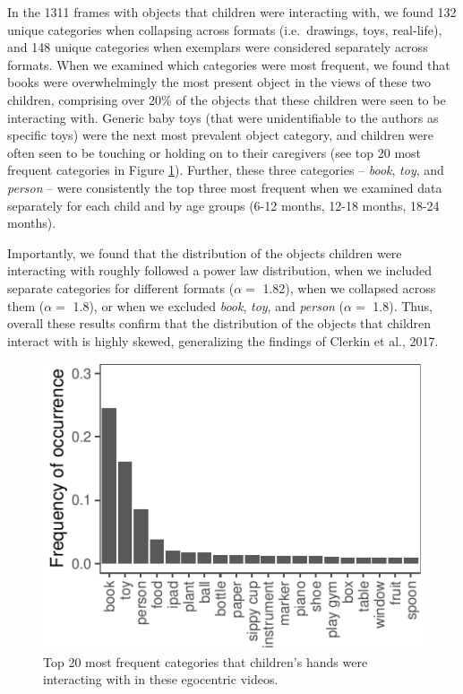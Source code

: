 \documentclass[10pt, letterpaper]{article}
\newenvironment{CodeChunk}{}{}
\begin{document}
In the 1311 frames with objects that children were interacting with, we
found 132 unique categories when collapsing across formats
(i.e.~drawings, toys, real-life), and 148 unique categories when
exemplars were considered separately across formats. When we examined
which categories were most frequent, we found that books were
overwhelmingly the most present object in the views of these two
children, comprising over 20\% of the objects that these children were
seen to be interacting with. Generic baby toys (that were unidentifiable
to the authors as specific toys) were the next most prevalent object
category, and children were often seen to be touching or holding on to
their caregivers (see top 20 most frequent categories in Figure
\ref{fig:freq_interact}). Further, these three categories --
\emph{book}, \emph{toy}, and \emph{person} -- were consistently the top
three most frequent when we examined data separately for each child and
by age groups (6-12 months, 12-18 months, 18-24 months).

Importantly, we found that the distribution of the objects children were
interacting with roughly followed a power law distribution, when we
included separate categories for different formats (\(\alpha =\) 1.82),
when we collapsed across them (\(\alpha =\) 1.8), or when we excluded
\emph{book}, \emph{toy}, and \emph{person} (\(\alpha =\) 1.8). Thus,
overall these results confirm that the distribution of the objects that
children interact with is highly skewed, generalizing the findings of
Clerkin et al., 2017.

\begin{CodeChunk}
\begin{figure}[h]

{\centering \includegraphics{figs/freq_interact-1} 

}

\caption[Top 20 most frequent categories that children's hands were interacting with in these egocentric videos]{Top 20 most frequent categories that children's hands were interacting with in these egocentric videos.}\label{fig:freq_interact}
\end{figure}
\end{CodeChunk}
\end{document}
